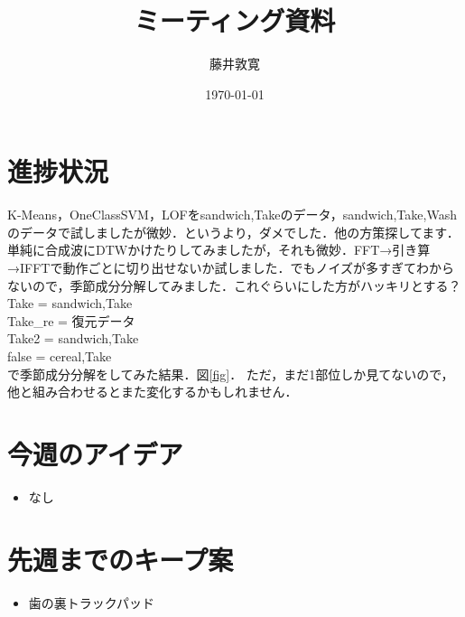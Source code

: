 \documentclass[a4j,twocolumn,10pt]{jarticle}
\title{ミーティング資料}
\author{藤井敦寛}
\date{\today}
\begin{document}
\maketitle

\section{進捗状況}
K-Means，OneClassSVM，LOFをsandwich,Takeのデータ，sandwich,Take,Washのデータで試しましたが微妙．というより，ダメでした．他の方策探してます．単純に合成波にDTWかけたりしてみましたが，それも微妙．FFT→引き算→IFFTで動作ごとに切り出せないか試しました．でもノイズが多すぎてわからないので，季節成分分解してみました．これぐらいにした方がハッキリとする？\\
Take = sandwich,Take\\
Take\_re = 復元データ\\
Take2 = sandwich,Take\\
false = cereal,Take\\
で季節成分分解をしてみた結果．図\ref{fig}．
ただ，まだ1部位しか見てないので，他と組み合わせるとまた変化するかもしれません．

\section{今週のアイデア}
\begin{itemize}
  \item なし
\end{itemize}

\section{先週までのキープ案}
\begin{itemize}
  \item 歯の裏トラックパッド
\end{itemize}
\end{document}
